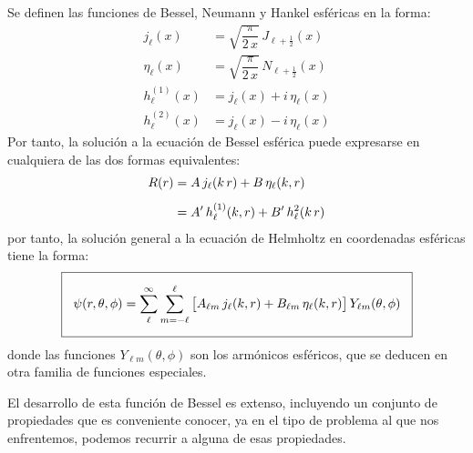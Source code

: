 Se definen las funciones de Bessel, Neumann y Hankel esféricas en la forma:
\begin{align*}
j_{\ell} (x) &= \sqrt{\dfrac{\pi}{2 \, x}} \, J_{\ell+\frac{1}{2}} (x) \\[0.5em]
\eta_{\ell} (x) &= \sqrt{\dfrac{\pi}{2 \, x}} \, N_{\ell+\frac{1}{2}} (x) \\[0.5em]
h_{\ell}^{(1)} (x) &= j_{\ell} (x) + i \, \eta_{\ell} (x) \\[0.5em]
h_{\ell}^{(2)} (x) &= j_{\ell} (x) - i \, \eta_{\ell} (x)
\end{align*}
Por tanto, la solución a la ecuación de Bessel esférica puede expresarse en cualquiera de las dos formas equivalentes:
\begin{align}
\begin{aligned}
R(r) &= A \, j_{\ell} (k \, r) +  B \, \eta_{\ell} (k , r) \\[0.5em]
&= {A}^{\prime} \, h_{\ell}^{(1)} (k , r) + {B}^{\prime} \, h_{\ell}^{2} (k \, r)
\end{aligned}
\label{eq:ecuacion_08_18}
\end{align}
por tanto, la solución general a la ecuación de Helmholtz en coordenadas esféricas tiene la forma:
\begin{align*}
\setlength{\fboxsep}{3\fboxsep}\boxed{
\psi (r, \theta, \phi) = \sum_{\ell}^{\infty} \sum_{m=-\ell}^{\ell} \big[ A_{\ell m} \, j_{\ell} (k , r) + B_{\ell m} \, \eta_{\ell} (k , r) \big] \, Y_{\ell m} (\theta, \phi)}
\end{align*}
donde las funciones $Y_{\ell m} (\theta, \phi)$ son los armónicos esféricos, que se deducen en otra familia de funciones especiales.
\par
El desarrollo de esta función de Bessel es extenso, incluyendo un conjunto de propiedades que es conveniente conocer, ya en el tipo de problema al que nos enfrentemos, podemos recurrir a alguna de esas propiedades.

